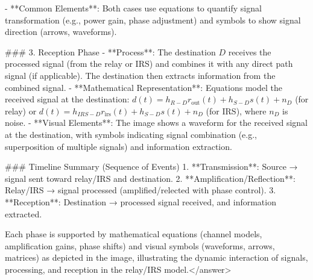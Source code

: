 - **Common Elements**: Both cases use equations to quantify signal transformation (e.g., power gain, phase adjustment) and symbols to show signal direction (arrows, waveforms).  


### 3. Reception Phase  
- **Process**: The destination \( D \) receives the processed signal (from the relay or IRS) and combines it with any direct path signal (if applicable). The destination then extracts information from the combined signal.  
- **Mathematical Representation**: Equations model the received signal at the destination: \( d(t) = h_{R-D} r_{\text{out}}(t) + h_{S-D} s(t) + n_D \) (for relay) or \( d(t) = h_{IRS-D} r_{\text{irs}}(t) + h_{S-D} s(t) + n_D \) (for IRS), where \( n_D \) is noise.  
- **Visual Elements**: The image shows a waveform for the received signal at the destination, with symbols indicating signal combination (e.g., superposition of multiple signals) and information extraction.  


### Timeline Summary (Sequence of Events)  
1. **Transmission**: Source → signal sent toward relay/IRS and destination.  
2. **Amplification/Reflection**: Relay/IRS → signal processed (amplified/relected with phase control).  
3. **Reception**: Destination → processed signal received, and information extracted.  

Each phase is supported by mathematical equations (channel models, amplification gains, phase shifts) and visual symbols (waveforms, arrows, matrices) as depicted in the image, illustrating the dynamic interaction of signals, processing, and reception in the relay/IRS model.</answer>